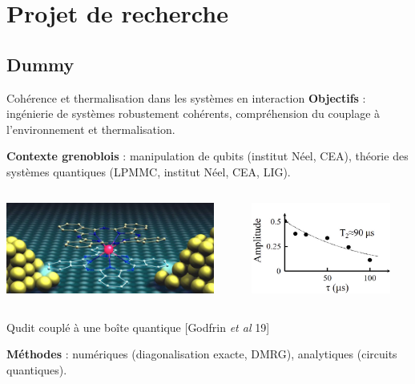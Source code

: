 \section{Projet de recherche}
\subsection{Dummy}

\begin{frame}{Cohérence et thermalisation dans les systèmes en interaction}
\textbf{Objectifs} : ingénierie de systèmes robustement cohérents, compréhension du couplage à l'environnement et thermalisation.

\textbf{Contexte grenoblois} : manipulation de qubits (institut Néel, CEA), théorie des systèmes quantiques (LPMMC, institut Néel, CEA, LIG).

\begin{columns}
	\begin{column}{0.5\textwidth}
		\centering
		\includegraphics[height=3cm]{img/2_projet_recherche/Godfrin_YbQudit_closeup}
	\end{column}
	\begin{column}{0.6\textwidth}
		\centering
		\includegraphics[height=3cm]{img/2_projet_recherche/Godfrin_coherence_time}
	\end{column}
\end{columns}
{

\centering
Qudit couplé à une boîte quantique {\footnotesize[Godfrin \emph{et al} 19]}

}

\textbf{Méthodes} : numériques (diagonalisation exacte, DMRG), analytiques (circuits quantiques).
\end{frame}

